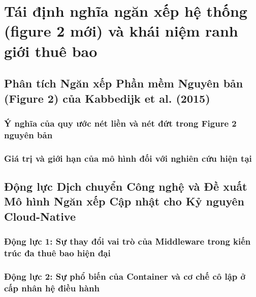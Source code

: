 \par{}
\section{Tái định nghĩa ngăn xếp hệ thống (figure 2 mới) và khái niệm ranh giới thuê bao}
\label{outline:1:reference-model:1}

\par{}
\subsection{Phân tích Ngăn xếp Phần mềm Nguyên bản (Figure 2) của Kabbedijk et al. (2015)}
\label{outline:1:reference-model:2}

\par{}
\subsubsection{Ý nghĩa của quy ước nét liền và nét đứt trong Figure 2 nguyên bản}
\label{outline:1:reference-model:3}

\par{}
\subsubsection{Giá trị và giới hạn của mô hình đối với nghiên cứu hiện tại}
\label{outline:1:reference-model:4}

\par{}
\subsection{Động lực Dịch chuyển Công nghệ và Đề xuất Mô hình Ngăn xếp Cập nhật cho Kỷ nguyên Cloud-Native}
\label{outline:1:reference-model:5}

\par{}
\subsubsection{Động lực 1: Sự thay đổi vai trò của Middleware trong kiến trúc đa thuê bao hiện đại}
\label{outline:1:reference-model:6}

\par{}
\subsubsection{Động lực 2: Sự phổ biến của Container và cơ chế cô lập ở cấp nhân hệ điều hành}
\label{outline:1:reference-model:7}

